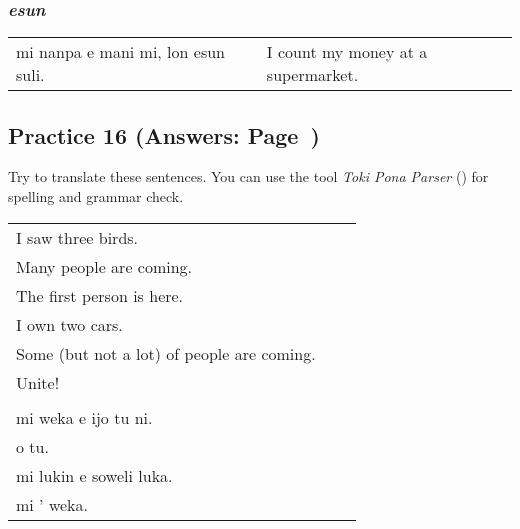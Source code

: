 \subsubsection*{\textit{esun}}

\begin{supertabular}{p{5,5cm}|ll}
mi nanpa e mani mi, lon esun suli. && I count my money at a supermarket. \\
\end{supertabular}
%
\subsection*{Practice 16 (Answers: Page~\pageref{'numbers'})}
%
Try to translate these sentences. 
You can use the tool \textit{Toki Pona Parser} (\cite{www:rowa:02}) for spelling and grammar check. 

\begin{supertabular}{p{5,5cm}|ll}
I saw three birds.    \\ %
Many people are coming. \\   %
The first person is here. \\   %
I own two cars.   \\ %
Some (but not a lot) of people are coming. \\  %
Unite!    \\ %
 && \\ %
mi weka e ijo tu ni.   \\ %
o tu.   \\ %
mi lukin e soweli luka. \\   %
mi ' weka.   \\ %
\end{supertabular}

